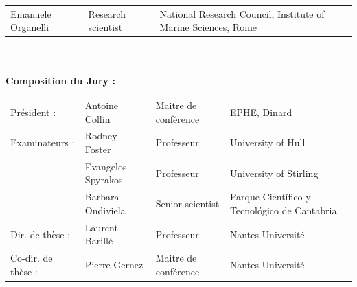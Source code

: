 \begin{titlepage}
\begin{tabular}{@{}l l l@{}}
    {\fontsize{10}{14}\selectfont \textcolor{textgray}{Emanuele Organelli}} & 
    {\fontsize{10}{14}\selectfont \textcolor{textgray}{Research scientist}} & 
    {\fontsize{10}{14}\selectfont \textcolor{textgray}{National Research Council, Institute of Marine Sciences, Rome}} \\
\end{tabular}\\\\

{\fontsize{12}{16}\selectfont \textbf{Composition du Jury : }}

\begin{tabular}{@{}l l l l@{}}
    {\fontsize{10}{14}\selectfont \textcolor{textgray}{Président :}} & 
    {\fontsize{10}{14}\selectfont \textcolor{textgray}{Antoine Collin}} & 
    {\fontsize{10}{14}\selectfont \textcolor{textgray}{Maitre de conférence}} & 
    {\fontsize{10}{14}\selectfont \textcolor{textgray}{EPHE, Dinard}} \\

    {\fontsize{10}{14}\selectfont \textcolor{textgray}{Examinateurs :}} & 
    {\fontsize{10}{14}\selectfont \textcolor{textgray}{Rodney Foster}} & 
    {\fontsize{10}{14}\selectfont \textcolor{textgray}{Professeur}} & 
    {\fontsize{10}{14}\selectfont \textcolor{textgray}{University of Hull}} \\

    {\fontsize{10}{14}\selectfont \textcolor{textgray}{}} & 
    {\fontsize{10}{14}\selectfont \textcolor{textgray}{Evangelos Spyrakos}} & 
    {\fontsize{10}{14}\selectfont \textcolor{textgray}{Professeur}} & 
    {\fontsize{10}{14}\selectfont \textcolor{textgray}{University of Stirling}} \\

    {\fontsize{10}{14}\selectfont \textcolor{textgray}{}} & 
    {\fontsize{10}{14}\selectfont \textcolor{textgray}{Barbara Ondiviela}} & 
    {\fontsize{10}{14}\selectfont \textcolor{textgray}{Senior scientist}} & 
    {\fontsize{10}{14}\selectfont \textcolor{textgray}{Parque Científico y Tecnológico de Cantabria}} \\

    {\fontsize{10}{14}\selectfont \textcolor{textgray}{Dir. de thèse :}} & 
    {\fontsize{10}{14}\selectfont \textcolor{textgray}{Laurent Barillé}} & 
    {\fontsize{10}{14}\selectfont \textcolor{textgray}{Professeur}} & 
    {\fontsize{10}{14}\selectfont \textcolor{textgray}{Nantes Université}} \\

    {\fontsize{10}{14}\selectfont \textcolor{textgray}{Co-dir. de thèse :}} & 
    {\fontsize{10}{14}\selectfont \textcolor{textgray}{Pierre Gernez}} & 
    {\fontsize{10}{14}\selectfont \textcolor{textgray}{Maitre de conférence}} & 
    {\fontsize{10}{14}\selectfont \textcolor{textgray}{Nantes Université}} \\
\end{tabular} \\\\


\end{titlepage}
